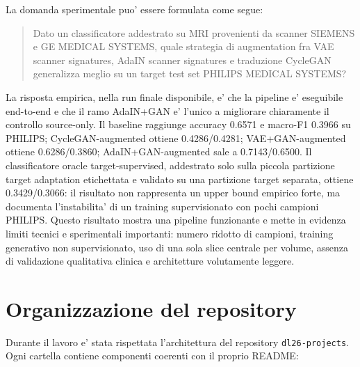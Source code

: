 \documentclass[12pt,a4paper]{article}
\begin{document}
La domanda sperimentale puo' essere formulata come segue:

\begin{quote}
Dato un classificatore addestrato su MRI provenienti da scanner SIEMENS e GE MEDICAL SYSTEMS, quale strategia di augmentation fra VAE scanner signatures, AdaIN scanner signatures e traduzione CycleGAN generalizza meglio su un target test set PHILIPS MEDICAL SYSTEMS?
\end{quote}

La risposta empirica, nella run finale disponibile, e' che la pipeline e' eseguibile end-to-end e che il ramo AdaIN+GAN e' l'unico a migliorare chiaramente il controllo source-only. Il baseline raggiunge accuracy 0.6571 e macro-F1 0.3966 su PHILIPS; CycleGAN-augmented ottiene 0.4286/0.4281; VAE+GAN-augmented ottiene 0.6286/0.3860; AdaIN+GAN-augmented sale a 0.7143/0.6500. Il classificatore oracle target-supervised, addestrato solo sulla piccola partizione target adaptation etichettata e validato su una partizione target separata, ottiene 0.3429/0.3066: il risultato non rappresenta un upper bound empirico forte, ma documenta l'instabilita' di un training supervisionato con pochi campioni PHILIPS. Questo risultato mostra una pipeline funzionante e mette in evidenza limiti tecnici e sperimentali importanti: numero ridotto di campioni, training generativo non supervisionato, uso di una sola slice centrale per volume, assenza di validazione qualitativa clinica e architetture volutamente leggere.

\section{Organizzazione del repository}

Durante il lavoro e' stata rispettata l'architettura del repository \texttt{dl26-projects}. Ogni cartella contiene componenti coerenti con il proprio README:
\end{document}
